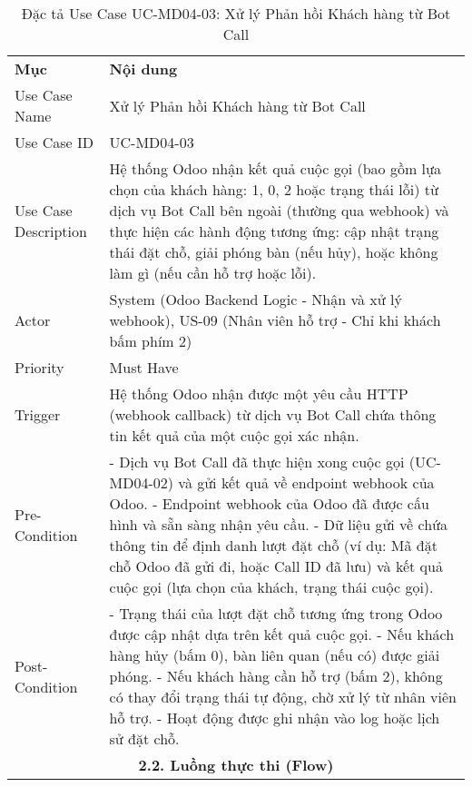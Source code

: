 \begin{longtable}{|m{4cm}|p{11cm}|}
\caption{Đặc tả Use Case UC-MD04-03: Xử lý Phản hồi Khách hàng từ Bot Call} \label{tab:uc_md04_03} \\
\hline

\endhead %
\hline
\endfoot %
\hline
\endlastfoot %
\multicolumn{2}{|c|}{\textbf{2.1. Tóm tắt (Summary)}} \\
\hline
\textbf{Mục} & \textbf{Nội dung} \\
\hline
Use Case Name & Xử lý Phản hồi Khách hàng từ Bot Call \\
\hline
Use Case ID & UC-MD04-03 \\
\hline
Use Case Description & Hệ thống Odoo nhận kết quả cuộc gọi (bao gồm lựa chọn của khách hàng: 1, 0, 2 hoặc trạng thái lỗi) từ dịch vụ Bot Call bên ngoài (thường qua webhook) và thực hiện các hành động tương ứng: cập nhật trạng thái đặt chỗ, giải phóng bàn (nếu hủy), hoặc không làm gì (nếu cần hỗ trợ hoặc lỗi). \\
\hline
Actor & System (Odoo Backend Logic - Nhận và xử lý webhook), US-09 (Nhân viên hỗ trợ - Chỉ khi khách bấm phím 2) \\
\hline
Priority & Must Have \\
\hline
Trigger & Hệ thống Odoo nhận được một yêu cầu HTTP (webhook callback) từ dịch vụ Bot Call chứa thông tin kết quả của một cuộc gọi xác nhận. \\
\hline
Pre-Condition & - Dịch vụ Bot Call đã thực hiện xong cuộc gọi (UC-MD04-02) và gửi kết quả về endpoint webhook của Odoo. \newline - Endpoint webhook của Odoo đã được cấu hình và sẵn sàng nhận yêu cầu. \newline - Dữ liệu gửi về chứa thông tin để định danh lượt đặt chỗ (ví dụ: Mã đặt chỗ Odoo đã gửi đi, hoặc Call ID đã lưu) và kết quả cuộc gọi (lựa chọn của khách, trạng thái cuộc gọi). \\
\hline
Post-Condition & - Trạng thái của lượt đặt chỗ tương ứng trong Odoo được cập nhật dựa trên kết quả cuộc gọi. \newline - Nếu khách hàng hủy (bấm 0), bàn liên quan (nếu có) được giải phóng. \newline - Nếu khách hàng cần hỗ trợ (bấm 2), không có thay đổi trạng thái tự động, chờ xử lý từ nhân viên hỗ trợ. \newline - Hoạt động được ghi nhận vào log hoặc lịch sử đặt chỗ. \\
\hline
\multicolumn{2}{|c|}{\textbf{2.2. Luồng thực thi (Flow)}} \\

\end{longtable}
